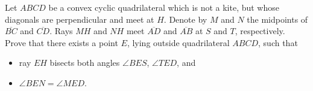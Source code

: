 Let $ABCD$ be a convex cyclic quadrilateral which is not a kite, but whose diagonals are perpendicular and meet at $H$. Denote by $M$ and $N$ the midpoints of $\overline{BC}$ and $\overline{CD}$. Rays $MH$ and $NH$ meet $\overline{AD}$ and $\overline{AB}$ at $S$ and $T$, respectively. Prove that there exists a point $E$, lying outside quadrilateral $ABCD$, such that
\begin{itemize}
	\item ray $EH$ bisects both angles $\angle BES$, $\angle TED$, and
	\item $\angle BEN = \angle MED$.
\end{itemize}